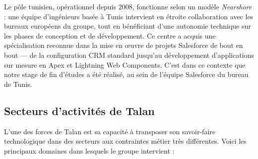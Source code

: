 \medskip

Le pôle tunisien, opérationnel depuis 2008, fonctionne selon un modèle \textit{Nearshore} : une équipe d'ingénieurs basée à Tunis intervient en étroite collaboration avec les bureaux européens du groupe, tout en bénéficiant d'une autonomie technique sur les phases de conception et de développement. Ce centre a acquis une spécialisation reconnue dans la mise en œuvre de projets Salesforce de bout en bout --- de la configuration CRM standard jusqu'au développement d'applications sur mesure en Apex et Lightning Web Components. C'est dans ce contexte que notre stage de fin d'études a été réalisé, au sein de l'équipe Salesforce du bureau de Tunis.

\FloatBarrier

\subsection{Secteurs d'activités de Talan}

L'une des forces de Talan est sa capacité à transposer son savoir-faire technologique dans des secteurs aux contraintes métier très différentes. Voici les principaux domaines dans lesquels le groupe intervient :

